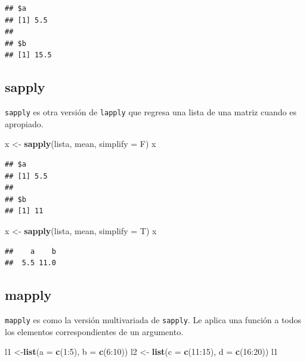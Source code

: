 \documentclass[]{article}
\newenvironment{Shaded}{\begin{snugshade}}{\end{snugshade}}
\newcommand{\KeywordTok}[1]{\textcolor[rgb]{0.13,0.29,0.53}{\textbf{{#1}}}}
\newcommand{\DataTypeTok}[1]{\textcolor[rgb]{0.13,0.29,0.53}{{#1}}}
\newcommand{\DecValTok}[1]{\textcolor[rgb]{0.00,0.00,0.81}{{#1}}}
\newcommand{\StringTok}[1]{\textcolor[rgb]{0.31,0.60,0.02}{{#1}}}
\newcommand{\NormalTok}[1]{{#1}}
\begin{document}
\begin{verbatim}
## $a
## [1] 5.5
## 
## $b
## [1] 15.5
\end{verbatim}

\subsection{sapply}\label{sapply}

\texttt{sapply} es otra versión de \texttt{lapply} que regresa una lista
de una matriz cuando es apropiado.

\begin{Shaded}
\begin{Highlighting}[]
\NormalTok{x <-}\StringTok{ }\KeywordTok{sapply}\NormalTok{(lista, mean, }\DataTypeTok{simplify =} \NormalTok{F)}
\NormalTok{x}
\end{Highlighting}
\end{Shaded}

\begin{verbatim}
## $a
## [1] 5.5
## 
## $b
## [1] 11
\end{verbatim}

\begin{Shaded}
\begin{Highlighting}[]
\NormalTok{x <-}\StringTok{ }\KeywordTok{sapply}\NormalTok{(lista, mean, }\DataTypeTok{simplify =} \NormalTok{T)}
\NormalTok{x}
\end{Highlighting}
\end{Shaded}

\begin{verbatim}
##    a    b 
##  5.5 11.0
\end{verbatim}

\subsection{mapply}\label{mapply}

\texttt{mapply} es como la versión multivariada de \texttt{sapply}. Le
aplica una función a todos los elementos correspondientes de un
argumento.

\begin{Shaded}
\begin{Highlighting}[]
\NormalTok{l1 <-}\KeywordTok{list}\NormalTok{(}\DataTypeTok{a =} \KeywordTok{c}\NormalTok{(}\DecValTok{1}\NormalTok{:}\DecValTok{5}\NormalTok{), }\DataTypeTok{b =} \KeywordTok{c}\NormalTok{(}\DecValTok{6}\NormalTok{:}\DecValTok{10}\NormalTok{))}
\NormalTok{l2 <-}\StringTok{ }\KeywordTok{list}\NormalTok{(}\DataTypeTok{c =} \KeywordTok{c}\NormalTok{(}\DecValTok{11}\NormalTok{:}\DecValTok{15}\NormalTok{), }\DataTypeTok{d =} \KeywordTok{c}\NormalTok{(}\DecValTok{16}\NormalTok{:}\DecValTok{20}\NormalTok{))}
\NormalTok{l1}
\end{Highlighting}
\end{Shaded}
\end{document}

